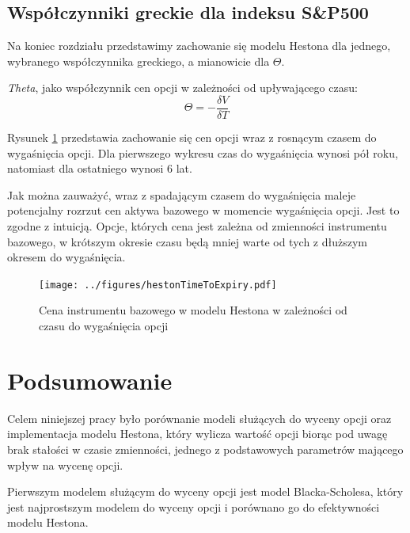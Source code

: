 \documentclass{pracamgr}
\begin{document}
\section{Współczynniki greckie dla indeksu S\&P500}

Na koniec rozdziału przedstawimy zachowanie się modelu Hestona dla jednego, wybranego współczynnika 
greckiego, a mianowicie dla $\Theta$.

\textit{Theta}, jako współczynnik cen opcji w zależności od upływającego czasu:
\begin{equation}
  \Theta = - \frac{\delta V}{\delta T}
\end{equation}

Rysunek \ref{fig:hestonTimeToExpiry} przedstawia zachowanie się cen opcji wraz z rosnącym czasem do 
wygaśnięcia opcji. Dla pierwszego wykresu czas do wygaśnięcia wynosi pół roku, natomiast dla 
ostatniego wynosi 6 lat. 

Jak można zauważyć, wraz z spadającym czasem do wygaśnięcia maleje potencjalny rozrzut cen aktywa 
bazowego w momencie wygaśnięcia opcji.
Jest to zgodne z intuicją. Opcje, których cena jest zależna od zmienności instrumentu bazowego, 
w krótszym okresie czasu będą mniej warte od tych z dłuższym okresem do wygaśnięcia.


\begin{figure}
  \texttt{[image: ../figures/hestonTimeToExpiry.pdf]}
  \caption{Cena instrumentu bazowego w modelu Hestona w zależności od czasu do wygaśnięcia opcji}
  \label{fig:hestonTimeToExpiry}
\end{figure}


\cleardoublepage
{}
\chapter*{Podsumowanie}\label{r:ending}
 

Celem niniejszej pracy było porównanie modeli służących do wyceny
opcji oraz implementacja modelu Hestona, który wylicza wartość opcji biorąc
pod uwagę brak stałości w czasie zmienności, jednego z podstawowych parametrów
mającego wpływ na wycenę opcji. 

Pierwszym modelem służącym do wyceny opcji jest model Blacka-Scholesa, który jest
najprostszym modelem do wyceny opcji i porównano go do efektywności modelu 
Hestona. 
\end{document}
